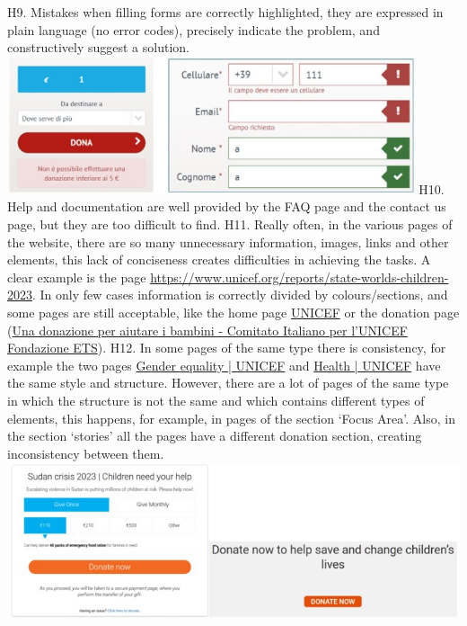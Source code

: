\newline H9.	Mistakes when filling forms are correctly highlighted, they are expressed in plain language (no error codes), precisely indicate the problem, and constructively suggest a solution.
\newline \includegraphics[width=0.9\textwidth]{FinalScores15.jpg}
\newline
\newline H10.	Help and documentation are well provided by the FAQ page and the contact us page, but they are too difficult to find.
\newline
\newline H11.	Really often, in the various pages of the website, there are so many unnecessary information, images, links and other elements, this lack of conciseness creates difficulties in achieving the tasks. A clear example is the page \href{https://www.unicef.org/reports/state-worlds-children-2023}{https://www.unicef.org/reports/state-worlds-children-2023}.
\newline In only few cases information is correctly divided by colours/sections, and some pages are still acceptable, like the home page \href{https://www.unicef.org/}{UNICEF} or the donation page (\href{https://donazioni.unicef.it}{Una donazione per aiutare i bambini - Comitato Italiano per l'UNICEF Fondazione ETS}).
\newline
\newline H12.	In some pages of the same type there is consistency, for example the two pages \href{https://www.unicef.org/gender-equality}{Gender equality | UNICEF} and \href{https://www.unicef.org/health}{Health | UNICEF} have the same style and structure.
\newline However, there are a lot of pages of the same type in which the structure is not the same and which contains different types of elements, this happens, for example, in pages of the section ‘Focus Area’.
\newline Also, in the section ‘stories’ all the pages have a different donation section, creating inconsistency between them.
\newline \includegraphics[width=\textwidth]{FinalScores16.jpg}
